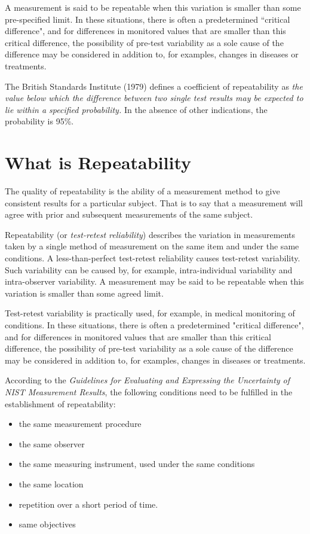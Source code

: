 \documentclass[12pt, a4paper]{report}
\theoremstyle{plain}
\theoremstyle{definition}
\theoremstyle{remark}
\begin{document}
		
		
		
		A measurement is said to be repeatable when this variation is smaller than some pre-specified limit. In these situations, there is often a predetermined ``critical difference", and for differences in monitored values that are smaller than this critical difference, the possibility of pre-test variability as a sole cause of the difference may be considered in addition to, for examples, changes in diseases or treatments. 
		
		
		The British Standards Institute (1979) defines a coefficient of repeatability  as \emph{the value below which the difference between two single test results may be expected to lie within a specified probability.} In the absence of other indications, the probability is 95\%.
		

	\section{What is Repeatability}
	The quality of repeatability is the ability of a measurement method to give consistent results for a particular subject. That is to say that a measurement will agree with prior and subsequent measurements of the same subject.

\bigskip
	Repeatability (or \textit{test-retest reliability})  describes the variation in measurements taken by a single method of measurement on the same item and under the same conditions. 
	A less-than-perfect test-retest reliability causes test-retest variability. Such variability can be caused by, for example, intra-individual variability and intra-observer variability. 
	A measurement may be said to be repeatable when this variation is smaller than some agreed limit.
	
	Test-retest variability is practically used, for example, in medical monitoring of conditions. In these situations, there is often a predetermined "critical difference", and for differences in monitored values that are smaller than this critical difference, the possibility of pre-test variability as a sole cause of the difference may be considered in addition to, for examples, changes in diseases or treatments.
	
	According to the \textit{Guidelines for Evaluating and Expressing the Uncertainty of NIST Measurement Results}, the following conditions need to be fulfilled in the establishment of repeatability:
	\begin{itemize}
		\item	the same measurement procedure
		\item	the same observer
		\item	the same measuring instrument, used under the same conditions
		\item	the same location
		\item	repetition over a short period of time.
		\item  same objectives
	\end{itemize}
	\bigskip
	
\end{document}
